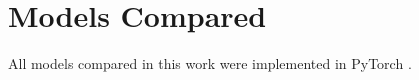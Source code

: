 
\chapter{Models Compared\label{ch:models-compared}}
All models compared in this work were implemented in PyTorch \parencite{Paszke2017}.


